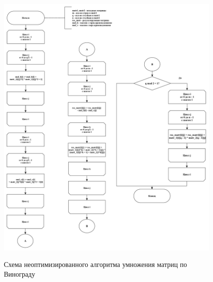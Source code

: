 \documentclass[a4paper,12pt]{article}
\begin{document}
        
        \begin{figure}[h!]
        	\begin{center}
        		{\includegraphics[width = \textwidth]{schema02.pdf}}
        		\caption{Схема неоптимизированного алгоритма умножения матриц по Винограду}
        		\label{fig:schema_mult_vin}
        	\end{center}
        \end{figure}
    
\end{document}
